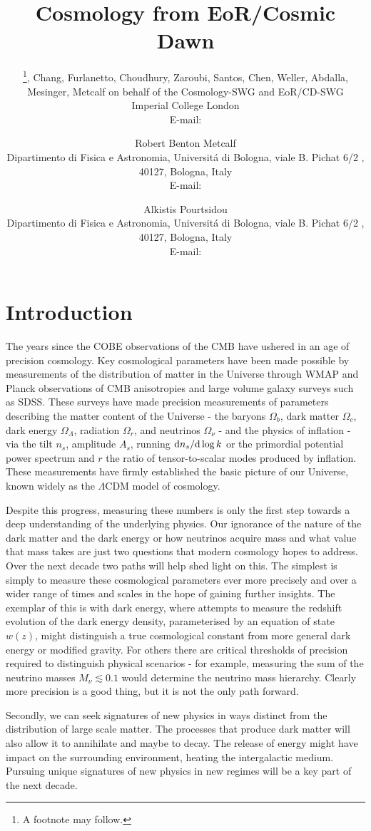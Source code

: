 \documentclass{PoS}
\title{Cosmology from EoR/Cosmic Dawn}
\author{\speaker{Pritchard}\thanks{A footnote may follow.}, Chang, Furlanetto, Choudhury, Zaroubi, Santos, Chen, Weller, Abdalla, Mesinger, Metcalf on behalf of the Cosmology-SWG and EoR/CD-SWG\\
        Imperial College London\\
        E-mail: \email{j.pritchard@imperial.ac.uk}}
\author{Robert Benton Metcalf\\
        Dipartimento di Fisica e Astronomia, Universit\'{a} di Bologna, viale B. Pichat 6/2 , 40127, Bologna, Italy\\
        E-mail: \email{robertbenton.metcalf@unibo.it}}
\author{Alkistis Pourtsidou\\
        Dipartimento di Fisica e Astronomia, Universit\'{a} di Bologna, viale B. Pichat 6/2 , 40127, Bologna, Italy\\
        E-mail: \email{alkistis.pourtsidou@unibo.it}}
\newcommand{\ud}{{\rm d}}
\begin{document}
\section{Introduction}

The years since the COBE observations of the CMB have ushered in an age of precision cosmology. Key cosmological parameters have been made possible by measurements of the distribution of matter in the Universe through WMAP and Planck observations of CMB anisotropies and large volume galaxy surveys such as SDSS. These surveys have made precision measurements of parameters describing the matter content of the Universe - the baryons $\Omega_b$, dark matter $\Omega_c$, dark energy $\Omega_\Lambda$, radiation $\Omega_r$, and neutrinos $\Omega_\nu$ - and the physics of inflation - via the tilt $n_s$, amplitude $A_s$, running $\ud n_s/\ud\log k$ or the primordial potential power spectrum and $r$ the ratio of tensor-to-scalar modes produced by inflation. These measurements have firmly established the basic picture of our Universe, known widely as the $\Lambda$CDM model of cosmology.

Despite this progress, measuring these numbers is only the first step towards a deep understanding of the underlying physics. Our ignorance of the nature of the dark matter and the dark energy or how neutrinos acquire mass and what value that mass takes are just two questions that modern cosmology hopes to address. Over the next decade two paths will help shed light on this. The simplest is simply to measure these cosmological parameters ever more precisely and over a wider range of times and scales in the hope of gaining further insights. The exemplar of this is with dark energy, where attempts to measure the redshift evolution of the dark energy density, parameterised by an equation of state $w(z)$, might distinguish a true cosmological constant from more general dark energy or modified gravity. For others there are critical thresholds of precision required to distinguish physical scenarios - for example, measuring the sum of the neutrino masses $M_\nu\lesssim0.1$ would determine the neutrino mass hierarchy. Clearly more precision is a good thing, but it is not the only path forward.

Secondly, we can seek signatures of new physics in ways distinct from the distribution of large scale matter. The processes that produce dark matter will also allow it to annihilate and maybe to decay. The release of energy might have impact on the surrounding environment, heating the intergalactic medium. Pursuing unique signatures of new physics in new regimes will be a key part of the next decade.
\end{document}
